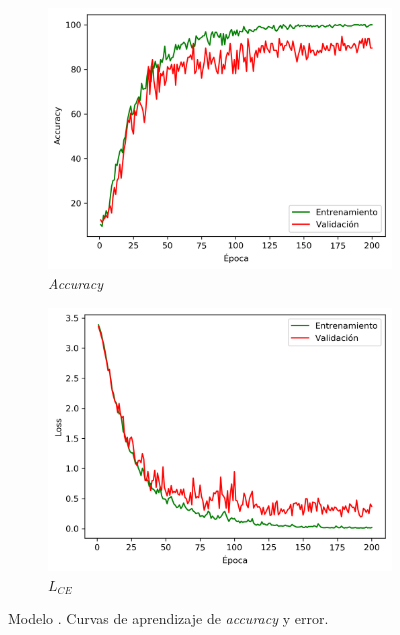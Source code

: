 \begin{figure}[h]
    \begin{subfigure}{0.5\linewidth}
        \centering
        \includegraphics[width=\linewidth]{imagenes/experiments/SHREC16_Accuracy.png}
        \caption{\textit{Accuracy}}
        \label{subfig:acc_shrec16}
    \end{subfigure}
    \begin{subfigure}{0.5\linewidth}
        \centering
        \includegraphics[width=\linewidth]{imagenes/experiments/SHREC16_Loss.png}
        \caption{$L_{CE}$}
        \label{subfig:loss_shrec16}
    \end{subfigure}
    \caption[SHREC16: Curvas de aprendizaje]{Modelo . Curvas de aprendizaje de \textit{accuracy} y error.}
    \label{fig:shrec16}
\end{figure}

